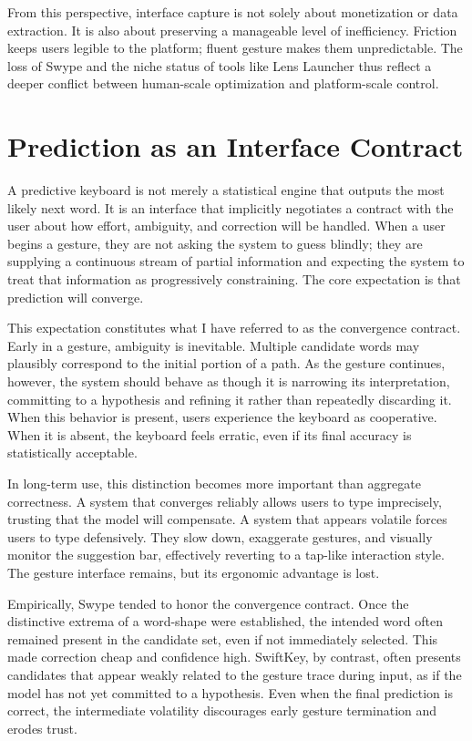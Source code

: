 \documentclass[11pt]{article}
\begin{document}
From this perspective, interface capture is not solely about monetization or data extraction. It is also about preserving a manageable level of inefficiency. Friction keeps users legible to the platform; fluent gesture makes them unpredictable. The loss of Swype and the niche status of tools like Lens Launcher thus reflect a deeper conflict between human-scale optimization and platform-scale control.

\section{Prediction as an Interface Contract}

A predictive keyboard is not merely a statistical engine that outputs the most likely next word. It is an interface that implicitly negotiates a contract with the user about how effort, ambiguity, and correction will be handled. When a user begins a gesture, they are not asking the system to guess blindly; they are supplying a continuous stream of partial information and expecting the system to treat that information as progressively constraining. The core expectation is that prediction will converge.

This expectation constitutes what I have referred to as the convergence contract. Early in a gesture, ambiguity is inevitable. Multiple candidate words may plausibly correspond to the initial portion of a path. As the gesture continues, however, the system should behave as though it is narrowing its interpretation, committing to a hypothesis and refining it rather than repeatedly discarding it. When this behavior is present, users experience the keyboard as cooperative. When it is absent, the keyboard feels erratic, even if its final accuracy is statistically acceptable.

In long-term use, this distinction becomes more important than aggregate correctness. A system that converges reliably allows users to type imprecisely, trusting that the model will compensate. A system that appears volatile forces users to type defensively. They slow down, exaggerate gestures, and visually monitor the suggestion bar, effectively reverting to a tap-like interaction style. The gesture interface remains, but its ergonomic advantage is lost.

Empirically, Swype tended to honor the convergence contract. Once the distinctive extrema of a word-shape were established, the intended word often remained present in the candidate set, even if not immediately selected. This made correction cheap and confidence high. SwiftKey, by contrast, often presents candidates that appear weakly related to the gesture trace during input, as if the model has not yet committed to a hypothesis. Even when the final prediction is correct, the intermediate volatility discourages early gesture termination and erodes trust.
\end{document}
